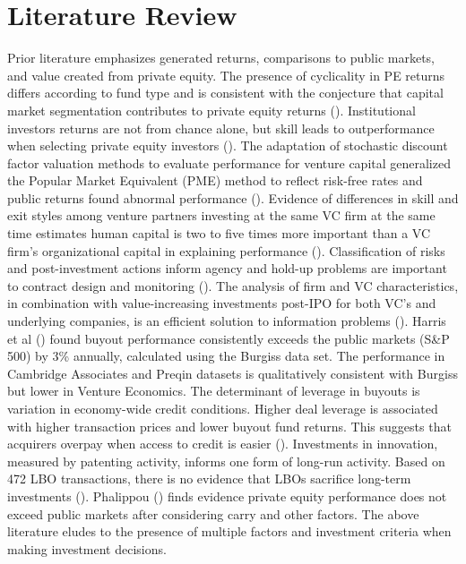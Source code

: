 \documentclass[12pt]{article}
\begin{document}
\section{Literature Review}\label{lit-review}
Prior literature emphasizes generated returns, comparisons to public markets, and value created from private equity.
The presence of cyclicality in PE returns differs according to fund type and is consistent with the conjecture that capital market segmentation contributes to private equity returns (\cite{cavagnaro2019measuring}).
Institutional investors returns are not from chance alone, but skill leads to outperformance when selecting private equity investors (\cite{ang2018estimating}).
The adaptation of stochastic discount factor valuation methods to evaluate performance for venture capital generalized the Popular Market Equivalent (PME) method to reflect risk-free rates and public returns found abnormal performance (\cite{korteweg2016risk}).
Evidence of differences in skill and exit styles among venture partners investing at the same VC firm at the same time estimates human capital is two to five times more important than a VC firm’s organizational capital in explaining performance (\cite{ewens2015vc}).
Classification of risks and post-investment actions inform agency and hold-up problems are important to contract design and monitoring (\cite{kaplan2004characteristics}).
The analysis of firm and VC characteristics, in combination with value-increasing investments post-IPO for both VC’s and underlying companies, is an efficient solution to information problems (\cite{iliev2020venturing}).
Harris et al (\citeyear{harris2014private}) found buyout performance consistently exceeds the public markets (S\&P 500) by 3\% annually, calculated using the Burgiss data set. 
The performance in Cambridge Associates and Preqin datasets is qualitatively consistent with Burgiss but lower in Venture Economics.
The determinant of leverage in buyouts is variation in economy-wide credit conditions. 
Higher deal leverage is associated with higher transaction prices and lower buyout fund returns.
This suggests that acquirers overpay when access to credit is easier (\cite{axelson2013borrow}).
Investments in innovation, measured by patenting activity, informs one form of long-run activity. 
Based on 472 LBO transactions, there is no evidence that LBOs sacrifice long-term investments (\cite{lerner2011long}).
Phalippou (\citeyear{phalippou2020inconvenient}) finds evidence private equity performance does not exceed public markets after considering carry and other factors.
The above literature eludes to the presence of multiple factors and investment criteria when making investment decisions.
\end{document}
